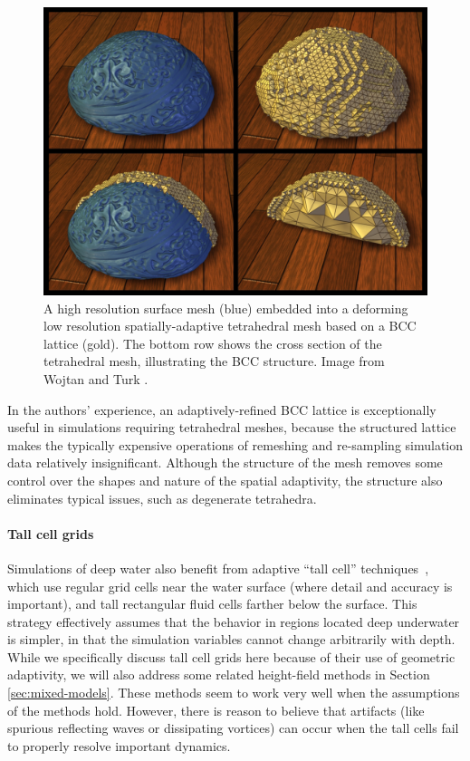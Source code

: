 \begin{figure}[t]
\centering
\includegraphics[width=0.8\linewidth]{images/starAdaptivity-cgf2016/WT2008_BCC.png}
\caption[STAR adaptivity: Body-centered cubic mesh]{A high resolution surface mesh (blue) embedded into a deforming low resolution spatially-adaptive tetrahedral mesh based on a BCC lattice (gold). The bottom row shows the cross section of the tetrahedral mesh, illustrating the BCC structure. Image from Wojtan and Turk \cite{Wojtan2008}.}
\label{fig:WT_BCC}
\end{figure}

In the authors' experience, an adaptively-refined BCC lattice is exceptionally useful in simulations requiring tetrahedral meshes, because the structured lattice makes the typically expensive operations of remeshing and re-sampling simulation data relatively insignificant. Although the structure of the mesh removes some control over the shapes and nature of the spatial adaptivity, the structure also eliminates typical issues, such as degenerate tetrahedra.

\paragraph*{Tall cell grids} Simulations of deep water also benefit from adaptive ``tall cell'' techniques~\cite{Irving2006,Chentanez2011}, which use regular grid cells near the water surface (where detail and accuracy is important), and tall rectangular fluid cells farther below the surface. This strategy effectively assumes that the behavior in regions located deep underwater is simpler, in that the simulation variables cannot change arbitrarily with depth. While we specifically discuss tall cell grids here because of their use of geometric adaptivity, we will also address some related height-field methods in Section \ref{sec:mixed-models}. These methods seem to work very well when the assumptions of the methods hold. However, there is reason to believe that artifacts (like spurious reflecting waves or dissipating vortices) can occur when the tall cells fail to properly resolve important dynamics.

